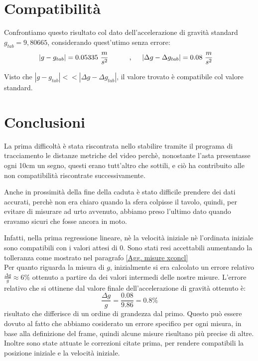 \documentclass[12pt, a4paper]{article}
\begin{document}
\section{Compatibilità}
Confrontiamo questo risultato col dato dell'accelerazione di gravità standard $g_{tab}=9,80665$, considerando quest'utimo senza errore:
\begin{equation*}
\begin{aligned}
  & |g-g_{tab}|=0.05335 \ \frac{m}{s^2}
  &\quad{} 
  \end{aligned}
  \begin{aligned}
  &&\text{,\phantom{..}}& & 
  |\Delta g-\Delta g_{tab}|=0.08\ \frac{m}{s^2}
  &
  \end{aligned}
\end{equation*}

Visto che $|g-g_{tab}|<< |\Delta g-\Delta g_{tab}|$, il valore trovato è compatibile col valore standard.





\section{Conclusioni}
La prima difficoltà è stata riscontrata nello stabilire tramite il programa di tracciamento le distanze metriche del video perchè, nonostante l'asta presentasse ogni 10cm un segno, questi erano tutt'altro che sottili, e ciò ha contribuito alle non compatibilità riscontrate successivamente. 

Anche in prossimità della fine della caduta è stato difficile prendere dei dati accurati, perchè non era chiaro quando la sfera colpisse il tavolo, quindi, per evitare di misurare ad urto avvenuto, abbiamo preso l'ultimo dato quando eravamo sicuri che fosse ancora in moto.

Infatti, nella prima regressione lineare, nè la velocità iniziale nè l'ordinata iniziale sono compatibili con i valori attesi di 0. Sono stati resi accettabili aumentando la tolleranza come mostrato nel paragrafo \ref{Agg. misure xconcl}\\

Per quanto riguarda la misura di $g$, inizialmente si era calcolato un errore relativo $\frac{\Delta g}{g}\approx 6\% $ ottenuto a partire da dei valori intermedi delle nostre misure. L'errore relativo che si ottinene dal valore finale dell'accelerazione di gravità ottenuto è:
\begin{equation*}
    \frac{\Delta g}{g}=\frac{0.08}{9.86}=0.8\%
\end{equation*}
risultato che differisce di un ordine di grandezza dal primo. Questo può essere dovuto al fatto che abbiamo cosiderato un errore specifico per ogni misura, in base alla definizione del frame, quindi alcune misure risultano più precise di altre. Inoltre sono state attuate le correzioni citate prima, per rendere compatibili  la posizione iniziale e la velocità iniziale. \\
\end{document}
